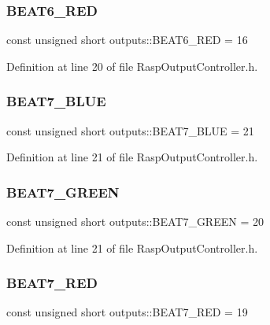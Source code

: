 \subsubsection{\texorpdfstring{B\+E\+A\+T6\+\_\+\+R\+ED}{BEAT6\_RED}}
{\footnotesize\ttfamily const unsigned short outputs\+::\+B\+E\+A\+T6\+\_\+\+R\+ED = 16}



Definition at line 20 of file Rasp\+Output\+Controller.\+h.

\mbox{\label{namespaceoutputs_a7051f5db20e6f0c0dc7dad8775d21b1f}} 
\subsubsection{\texorpdfstring{B\+E\+A\+T7\+\_\+\+B\+L\+UE}{BEAT7\_BLUE}}
{\footnotesize\ttfamily const unsigned short outputs\+::\+B\+E\+A\+T7\+\_\+\+B\+L\+UE = 21}



Definition at line 21 of file Rasp\+Output\+Controller.\+h.

\mbox{\label{namespaceoutputs_a971ea0c6742c83be5634cbf533cfb050}} 
\subsubsection{\texorpdfstring{B\+E\+A\+T7\+\_\+\+G\+R\+E\+EN}{BEAT7\_GREEN}}
{\footnotesize\ttfamily const unsigned short outputs\+::\+B\+E\+A\+T7\+\_\+\+G\+R\+E\+EN = 20}



Definition at line 21 of file Rasp\+Output\+Controller.\+h.

\mbox{\label{namespaceoutputs_a88730a5804ff8785e2fb07a1957a243c}} 
\subsubsection{\texorpdfstring{B\+E\+A\+T7\+\_\+\+R\+ED}{BEAT7\_RED}}
{\footnotesize\ttfamily const unsigned short outputs\+::\+B\+E\+A\+T7\+\_\+\+R\+ED = 19}



